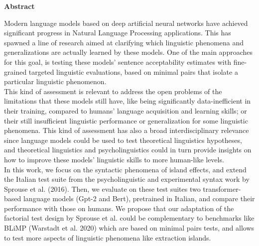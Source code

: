 \thispagestyle{plain}
\begin{center}
	\Large
	\vspace{1.8cm}
    \textbf{Abstract}
    	\vspace{0.9cm}
\end{center}

\normalsize
Modern language models based on deep artificial neural networks have achieved significant progress in Natural Language Processing applications. This has spawned a line of research aimed at clarifying which linguistic phenomena and generalizations are actually learned by these models. One of the main approaches for this goal, is testing these models' sentence acceptability estimates with fine-grained targeted linguistic evaluations, based on minimal pairs that isolate a particular linguistic phenomenon.\\

This kind of assessment is relevant to address the open problems of the limitations that these models still have, like being significantly data-inefficient in their training, compared to humans’ language acquisition and learning skills; or their still insufficient linguistic performance or generalization for some linguistic phenomena. This kind of assessment has also a broad interdisciplinary relevance since language models could be used to test theoretical linguistics hypotheses, and theoretical linguistics and psycholinguistics could in turn provide insights on how to improve these models' linguistic skills to more human-like levels.\\ 

In this work, we focus on the syntactic phenomena of island effects, and extend the Italian test suite from the psycholinguistic and experimental syntax work by Sprouse et al. (2016). Then,  we evaluate on these test suites two transformer-based language models (Gpt-2 and Bert), pretrained in Italian, and compare their performance with those on humans. We propose that our adaptation of the factorial test design by Sprouse et al. could be complementary to benchmarks like BLiMP (Warstadt et al. 2020) which are based on minimal pairs tests, and allows to test more aspects of linguistic phenomena like extraction islands.

